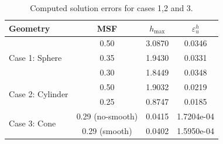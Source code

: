 \documentclass{article}
\begin{document}
\begin{table}[h!]
    \centering
    \renewcommand{\arraystretch}{1.2}
    \begin{tabular}{lccc}
    \hline
    \textbf{Geometry} & \textbf{MSF} & \textbf{$h_{\max}$} & \textbf{$\varepsilon_u^h$} \\
    \hline
    \multirow{3}{*}{Case 1: Sphere} 
      & 0.50 & 3.0870 & 0.0346 \\
      & 0.35 & 1.9430 & 0.0331 \\
      & 0.30 & 1.8449 & 0.0348 \\
    \hline
    \multirow{2}{*}{Case 2: Cylinder} 
      & 0.50 & 1.9032 & 0.0219 \\
      & 0.25 & 0.8747 & 0.0185 \\
    \hline
    \multirow{2}{*}{Case 3: Cone} 
      & 0.29 (no-smooth) & 0.0415 & 1.7204e-04 \\
      & 0.29 (smooth)    & 0.0402 & 1.5950e-04 \\
    \hline
    \end{tabular}
    \caption{Computed solution errors for cases 1,2 and 3.}
\end{table}

\newpage



\end{document}
